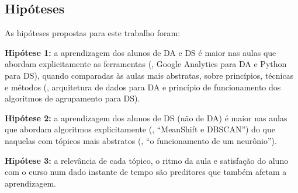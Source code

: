 \subsection{Hipóteses}
\label{sec:hipoteses}

As hipóteses propostas para este trabalho foram:
\begin{compactitem}
	\item \textbf{Hipótese 1:} a aprendizagem dos alunos de DA e DS é maior nas aulas que abordam explicitamente as ferramentas (\eg, Google Analytics para DA e Python para DS), quando comparadas às aulas mais abstratas, sobre princípios, técnicas e métodos (\eg, arquitetura de dados para DA e princípio de funcionamento dos algoritmos de agrupamento para DS).

	\item \textbf{Hipótese 2:} a aprendizagem dos alunos de DS (não de DA) é maior nas aulas que abordam algoritmos explicitamente (\eg, ``MeanShift e DBSCAN'') do que naquelas com tópicos mais abstratos (\eg, ``o funcionamento de um neurônio'').

	\item \textbf{Hipótese 3:} a relevância de cada tópico, o ritmo da aula e satisfação do aluno com o curso num dado instante de tempo são preditores que também afetam a aprendizagem.
\end{compactitem}
